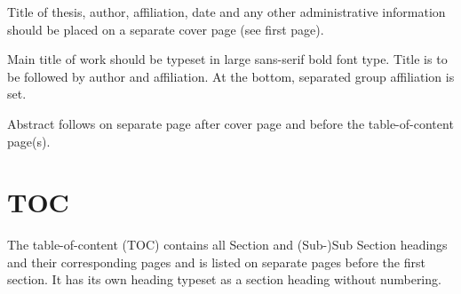 \documentclass[11pt, a4paper,oneside,chapterprefix=false]{scrbook}
\begin{document}
Title of thesis, author, affiliation, date and any other administrative information should be placed on a separate cover page (see first page).

Main title of work should be typeset in large sans-serif bold font type. Title is to be followed by author and affiliation. At the bottom, separated group affiliation is set.

Abstract follows on separate page after cover page and before the table-of-content page(s).


\section*{TOC}

The table-of-content (TOC) contains all Section and (Sub-)Sub Section headings and their corresponding pages and is listed on separate pages before the first section. It has its own heading typeset as a section heading without numbering.

%



\end{document}
